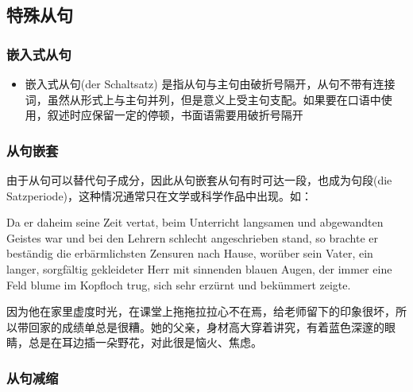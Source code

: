 \subsection{特殊从句}

\subsubsection{嵌入式从句}

\begin{itemize}
    \item 嵌入式从句(der Schaltsatz) 是指从句与主句由破折号隔开，从句不带有连接词，虽然从形式上与主句并列，但是意义上受主句支配。如果要在口语中使用，叙述时应保留一定的停顿，书面语需要用破折号隔开


\end{itemize}

\subsubsection{从句嵌套}

由于从句可以替代句子成分，因此从句嵌套从句有时可达一段，也成为句段(die Satzperiode)，这种情况通常只在文学或科学作品中出现。如：

Da er daheim seine Zeit vertat, beim Unterricht langsamen und abgewandten Geistes war und bei den Lehrern schlecht angeschrieben stand, so brachte er beständig die erbärmlichsten Zensuren nach Hause, worüber sein Vater, ein langer, sorgfältig gekleideter Herr mit sinnenden blauen Augen, der immer eine Feld blume im Kopfloch trug, sich sehr erzürnt und bekümmert zeigte.

{\color{codegray}因为他在家里虚度时光，在课堂上拖拖拉拉心不在焉，给老师留下的印象很坏，所以带回家的成绩单总是很糟。她的父亲，身材高大穿着讲究，有着蓝色深邃的眼睛，总是在耳边插一朵野花，对此很是恼火、焦虑。}

\subsubsection{从句减缩}

